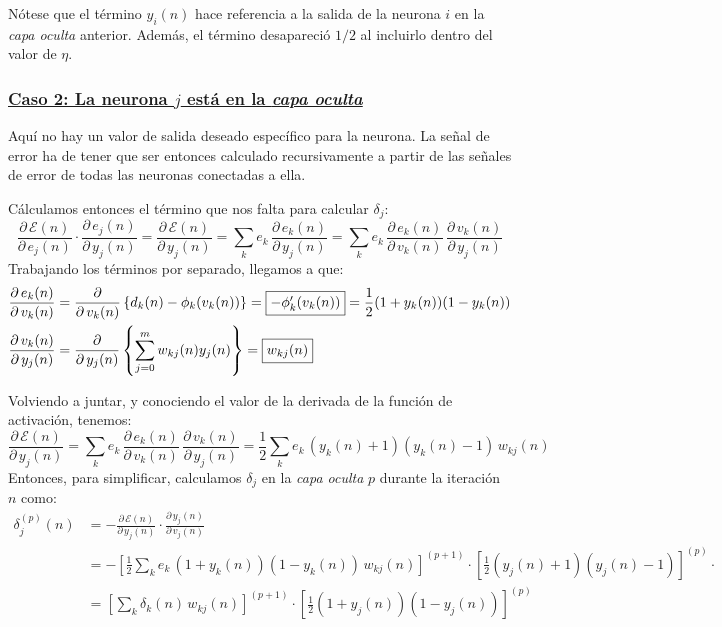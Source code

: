 \documentclass[10pt,a4paper]{article}
\begin{document}
Nótese que el término $y_i(n)$ hace referencia a la salida de la neurona $i$ en la \textit{capa oculta} anterior. Además, el término desapareció $1/2$ al incluirlo dentro del valor de $\eta$.

\subsubsection*{\underline{Caso 2: La neurona $j$ está en la \textit{capa oculta}}}

Aquí no hay un valor de salida deseado específico para la neurona. La señal de error ha de tener que ser entonces calculado recursivamente a partir de las señales de error de todas las neuronas conectadas a ella.

Cálculamos entonces el término que nos falta para calcular $\delta_j$:
\[
\frac{\partial \, \mathcal{E} (n)}{\partial \, e_j(n)} \cdot
\frac{\partial \, e_j (n)}{\partial \, y_j(n)} =
\frac{\partial \, \mathcal{E} (n)}{\partial \, y_j(n)} = 
\sum_k e_k \,\frac{\partial\,e_k(n)}{\partial\,y_j(n)} =
\sum_k e_k \,\frac{\partial\,e_k(n)}{\partial\,v_k(n)}\,\frac{\partial\,v_k(n)}{\partial\,y_j(n)}
\]
Trabajando los términos por separado, llegamos a que:
\begin{align*}
\frac{\partial\,e_k(n)}{\partial\,v_k(n)} &= 
\frac{\partial}{\partial\,v_k(n)} \left\{d_k(n) -\phi_k(v_k(n))\right\} =
\fbox{$-\phi_k'(v_k(n))$} =
\frac{1}{2}(1+y_k(n))(1-y_k(n)) \\
\frac{\partial\,v_k(n)}{\partial\,y_j(n)} &=
\frac{\partial}{\partial\,y_j(n)}\left\{\sum_{j=0}^m w_{kj}(n)y_j(n)\right\} =
\fbox{$w_{kj}(n)$}
\end{align*}

Volviendo a juntar, y conociendo el valor de la derivada de la función de activación, tenemos:
\[
\frac{\partial \, \mathcal{E} (n)}{\partial \, y_j(n)} = 
\sum_k e_k \,\frac{\partial\,e_k(n)}{\partial\,v_k(n)}\,\frac{\partial\,v_k(n)}{\partial\,y_j(n)} = \frac{1}{2} \sum_k e_k \, (y_k(n)+1)(y_k(n)-1) \, w_{kj}(n)
\]
Entonces, para simplificar, calculamos $\delta_j$ en la \textit{capa oculta} $p$ durante la iteración $n$ como:
\begin{align*}
\delta_j^{(p)}(n) &=
-
\frac{\partial \, \mathcal{E} (n)}{\partial \, y_j(n)} \cdot
\frac{\partial \, y_j (n)}{\partial \, v_j(n)}  \\&=
-\left[\frac{1}{2} \sum_k e_k \, (1+y_k(n))(1-y_k(n)) \, w_{kj}(n)\right]^{(p+1)} \cdot
\left[\frac{1}{2}(y_j(n)+1)(y_j(n)-1)\right]^{(p)} \cdot
\\&=
\left[\sum_k \delta_k(n) \, w_{kj}(n)\right]^{(p+1)} \cdot
\left[\frac{1}{2}(1+y_j(n))(1-y_j(n))\right]^{(p)} 
\end{align*}
\end{document}
